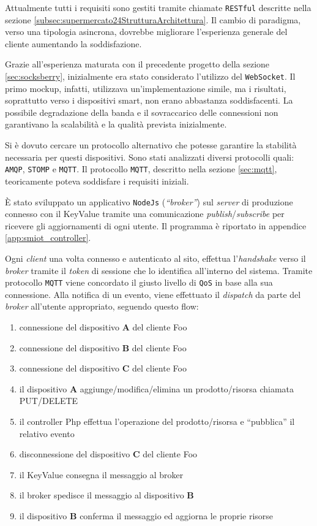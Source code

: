 Attualmente tutti i requisiti sono gestiti tramite chiamate \verb+RESTful+ descritte nella sezione \ref{subsec:supermercato24StrutturaArchitettura}.
Il cambio di paradigma, verso una tipologia asincrona, dovrebbe migliorare l'esperienza generale del cliente aumentando la soddisfazione.

Grazie all'esperienza maturata con il precedente progetto della sezione \ref{sec:socksberry}, inizialmente era stato considerato l'utilizzo del \verb+WebSocket+.
Il primo mockup, infatti, utilizzava un'implementazione simile, ma i risultati, soprattutto verso i dispositivi smart, non erano abbastanza soddisfacenti.
La possibile degradazione della banda e il sovraccarico delle connessioni non garantivano la scalabilità e la qualità prevista inizialmente.

Si è dovuto cercare un protocollo alternativo che potesse garantire la stabilità necessaria per questi dispositivi.
Sono stati analizzati diversi protocolli quali: \verb+AMQP+, \verb+STOMP+ e \verb+MQTT+.
Il protocollo \verb+MQTT+, descritto nella sezione \ref{sec:mqtt}, teoricamente poteva soddisfare i requisiti iniziali.

È stato sviluppato un applicativo \verb+NodeJs+  (\textit{``broker''}) sul \textit{server} di produzione connesso con il KeyValue tramite una comunicazione \textit{publish}/\textit{subscribe} per ricevere gli aggiornamenti di ogni utente.
Il programma è riportato in appendice \ref{app:smiot_controller}.

Ogni \textit{client} una volta connesso e autenticato al sito, effettua l'\textit{handshake} verso il \textit{broker} tramite il \textit{token} di sessione che lo identifica all'interno del sistema.
Tramite protocollo \verb+MQTT+ viene concordato il giusto livello di \verb+QoS+ in base alla sua connessione.
Alla notifica di un evento, viene effettuato il \textit{dispatch} da parte del \textit{broker} all'utente appropriato, seguendo questo flow:
\begin{enumerate}
  \item connessione del dispositivo \textbf{A} del cliente Foo
  \item connessione del dispositivo \textbf{B} del cliente Foo
  \item connessione del dispositivo \textbf{C} del cliente Foo
  \item il dispositivo \textbf{A} aggiunge/modifica/elimina un prodotto/risorsa chiamata PUT/DELETE
  \item il controller Php effettua l'operazione del prodotto/risorsa e ``pubblica'' il relativo evento
  \item disconnessione del dispositivo \textbf{C} del cliente Foo
  \item il KeyValue consegna il messaggio al broker
  \item il broker spedisce il messaggio al dispositivo \textbf{B}
  \item il dispositivo \textbf{B} conferma il messaggio ed aggiorna le proprie risorse
\end{enumerate}

